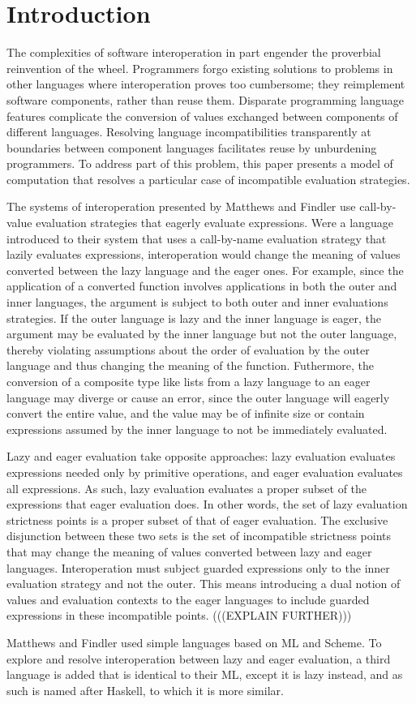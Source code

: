 \section{Introduction}

The complexities of software interoperation in part engender the proverbial reinvention of the wheel. Programmers forgo existing solutions to problems in other languages where interoperation proves too cumbersome; they reimplement software components, rather than reuse them. Disparate programming language features complicate the conversion of values exchanged between components of different languages. Resolving language incompatibilities transparently at boundaries between component languages facilitates reuse by unburdening programmers. To address part of this problem, this paper presents a model of computation that resolves a particular case of incompatible evaluation strategies.

The systems of interoperation presented by Matthews and Findler \cite{matthews07} use call-by-value evaluation strategies that eagerly evaluate expressions. Were a language introduced to their system that uses a call-by-name evaluation strategy that lazily evaluates expressions, interoperation would change the meaning of values converted between the lazy language and the eager ones. For example, since the application of a converted function involves applications in both the outer and inner languages, the argument is subject to both outer and inner evaluations strategies. If the outer language is lazy and the inner language is eager, the argument may be evaluated by the inner language but not the outer language, thereby violating assumptions about the order of evaluation by the outer language and thus changing the meaning of the function. Futhermore, the conversion of a composite type like lists from a lazy language to an eager language may diverge or cause an error, since the outer language will eagerly convert the entire value, and the value may be of infinite size or contain expressions assumed by the inner language to not be immediately evaluated.

Lazy and eager evaluation take opposite approaches: lazy evaluation evaluates expressions needed only by primitive operations, and eager evaluation evaluates all expressions. As such, lazy evaluation evaluates a proper subset of the expressions that eager evaluation does. In other words, the set of lazy evaluation strictness points is a proper subset of that of eager evaluation. The exclusive disjunction between these two sets is the set of incompatible strictness points that may change the meaning of values converted between lazy and eager languages. Interoperation must subject guarded expressions only to the inner evaluation strategy and not the outer. This means introducing a dual notion of values and evaluation contexts to the eager languages to include guarded expressions in these incompatible points. (((EXPLAIN FURTHER)))

Matthews and Findler used simple languages based on ML and Scheme. To explore and resolve interoperation between lazy and eager evaluation, a third language is added that is identical to their ML, except it is lazy instead, and as such is named after Haskell, to which it is more similar.
